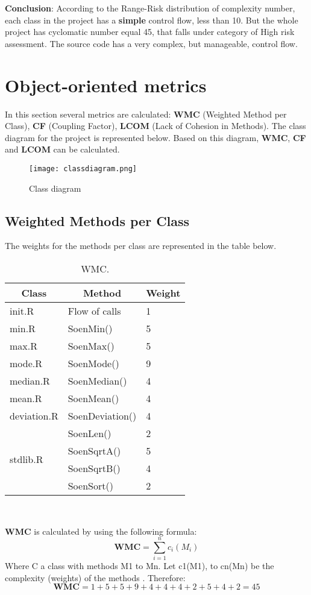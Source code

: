 \documentclass[12pt]{article}
\begin{document}
\textbf{Conclusion}: According to the Range-Risk distribution of complexity number, each class in the project has a \textbf{simple} control flow, less than 10. But the whole project has cyclomatic number equal 45, that falls under category of High risk assessment. The source code has a very complex, but manageable, control flow. 
\newpage
\section{Object-oriented metrics}
In this section several metrics are calculated: \textbf{WMC} (Weighted Method per Class), \textbf{CF} (Coupling Factor), \textbf{LCOM} (Lack of Cohesion in Methods). The class diagram for the project is represented below. Based on this diagram, \textbf{WMC}, \textbf{CF} and \textbf{LCOM} can be calculated.\\ 

\begin{figure}[h]
\centering
\texttt{[image: classdiagram.png]}
\caption{Class diagram}
\end{figure}
\newpage
\subsection{Weighted Methods per Class}
The weights for the methods per class are represented in the table below.
\begin{table}[h]
\centering
\begin{tabular}{|l|l|l|}
\hline
\multicolumn{1}{|c|}{\textbf{Class}} & \multicolumn{1}{c|}{\textbf{Method}} & \multicolumn{1}{c|}{\textbf{Weight}} \\ \hline
init.R & Flow of calls & 1 \\ \hline
min.R & SoenMin() & 5 \\ \hline
max.R & SoenMax() & 5 \\ \hline
mode.R & SoenMode() & 9 \\ \hline
median.R & SoenMedian() & 4 \\ \hline
mean.R & SoenMean() & 4 \\ \hline
deviation.R & SoenDeviation() & 4 \\ \hline
\multirow{4}{*}{stdlib.R} & SoenLen() & 2 \\ \cline{2-3} 
 & SoenSqrtA() & 5 \\ \cline{2-3} 
 & SoenSqrtB() & 4 \\ \cline{2-3} 
 & SoenSort() & 2 \\ \hline
\end{tabular}
\caption{WMC.}
\end{table}\\ 
\par \textbf{WMC} is calculated by using the following formula:
\begin{equation}
    \textbf{WMC} =\sum^{n}_{i=1}{c_{i}(M_{i})}  
\end{equation}
Where C a class with methods M1 to Mn. Let c1(M1), to cn(Mn) be the complexity (weights) of the methods \cite{OOD}. Therefore:
\begin{equation}
    \textbf{WMC} = 1+5+5+9+4+4+4+2+5+4+2 = 45  
\end{equation}
\end{document}
